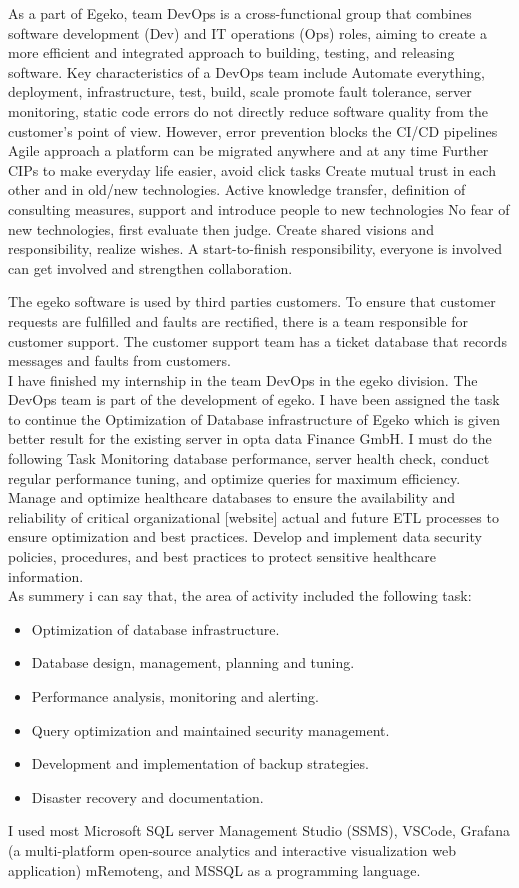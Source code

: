 As a part of Egeko, team DevOps is a cross-functional group that combines software development (Dev) and IT operations (Ops) roles, aiming to create a more efficient and integrated approach to building, testing, and releasing software. Key characteristics of a DevOps team include Automate everything, deployment, infrastructure, test, build, scale promote fault tolerance, server monitoring, static code errors do not directly reduce software quality from the customer's point of view. However, error prevention blocks the CI/CD pipelines Agile approach a platform can be migrated anywhere and at any time Further CIPs to make everyday life easier, avoid click tasks Create mutual trust in each other and in old/new technologies. Active knowledge transfer, definition of consulting measures, support and introduce people to new technologies No fear of new technologies, first evaluate then judge. Create shared visions and responsibility, realize wishes. A start-to-finish responsibility, everyone is involved can get involved and strengthen collaboration. 

The egeko software is used by third parties  customers. To ensure that customer requests are fulfilled and faults are rectified, there is a team responsible for customer support. The customer support team has a ticket database that records messages and faults from customers.\\

I have finished my internship in the team DevOps in the egeko division. The DevOps team is part of the development of egeko. I have been assigned the task to continue the Optimization of Database infrastructure of Egeko which is given better result for the existing server in opta data Finance GmbH. I must do the following Task Monitoring database performance, server health check, conduct regular performance tuning, and optimize queries for maximum efficiency. Manage and optimize healthcare databases to ensure the availability and reliability of critical organizational [website] actual and future ETL processes to ensure optimization and best practices. Develop and implement data security policies, procedures, and best practices to protect sensitive healthcare information.\\
As summery i can say that, the area of activity included the following task:
\begin{itemize}
    \item Optimization of database infrastructure.
    \item Database design, management, planning and tuning.
    \item Performance analysis, monitoring and alerting.
    \item Query optimization and maintained security management.
    \item Development and implementation of backup strategies.
    \item Disaster recovery and documentation.
\end{itemize}
I used most Microsoft SQL server Management Studio (SSMS), VSCode, Grafana (a multi-platform open-source analytics and interactive visualization web application) mRemoteng, and MSSQL as a programming language.

